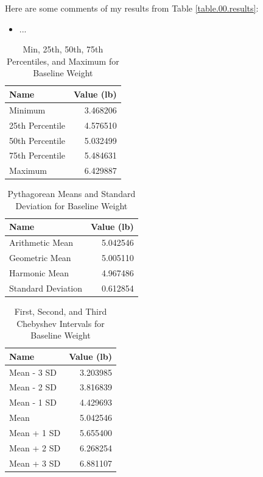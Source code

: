 Here are some comments of my results from Table \ref{table.00.results}:
\begin{itemize}
    \item ...
\end{itemize}
\begin{table}
    \centering
	\begin{tabular}{|l|r|} \hline
        \textbf{Name} & \textbf{Value (lb)} \\
        \hline
		Minimum & 3.468206 \\
		25th Percentile & 4.576510 \\
		50th Percentile & 5.032499 \\
		75th Percentile & 5.484631 \\
		Maximum & 6.429887 \\
		\hline
	\end{tabular}
    \caption{Min, 25th, 50th, 75th Percentiles, and Maximum for Baseline Weight}
    \label{table.00.baseline.descriptive}
\end{table}
\begin{table}
    \centering
	\begin{tabular}{|l|r|} \hline
		\textbf{Name} & \textbf{Value (lb)} \\
        \hline
		Arithmetic Mean & 5.042546 \\
		Geometric Mean & 5.005110 \\
        Harmonic Mean & 4.967486 \\
        Standard Deviation & 0.612854 \\
		\hline
	\end{tabular}
    \caption{Pythagorean Means and Standard Deviation for Baseline Weight}
    \label{table.00.baseline.means}
\end{table}
\begin{table}
    \centering
	\begin{tabular}{|l|r|} \hline
		\textbf{Name} & \textbf{Value (lb)} \\
		\hline
		Mean - 3 SD & 3.203985 \\
		Mean - 2 SD & 3.816839 \\
        Mean - 1 SD & 4.429693 \\
        Mean & 5.042546 \\
		Mean + 1 SD & 5.655400 \\
        Mean + 2 SD & 6.268254 \\
		Mean + 3 SD & 6.881107 \\
		\hline
	\end{tabular}
    \caption{First, Second, and Third Chebyshev Intervals for Baseline Weight}
    \label{table.00.baseline.chebyshev}
\end{table}
